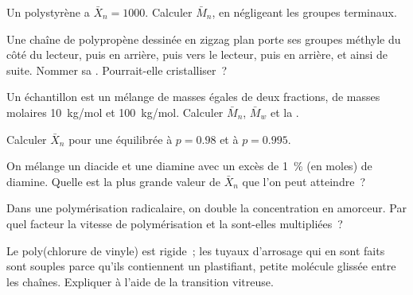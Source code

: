 \begin{exercise}[$\star$]\label{exo:b2:polymer-synthesis:3}
Un polystyrène a $\bar X_n = 1000$. Calculer $\bar M_n$, en négligeant les groupes terminaux.
\end{exercise}

\begin{exercise}[$\star$]\label{exo:b2:polymer-synthesis:4}
Une chaîne de polypropène dessinée en zigzag plan porte ses groupes méthyle du côté du lecteur, puis en
arrière, puis vers le lecteur, puis en arrière, et ainsi de suite. Nommer sa . Pourrait-elle cristalliser~?
\end{exercise}

\begin{exercise}[$\star\star$]\label{exo:b2:polymer-synthesis:5}
Un échantillon est un mélange de masses égales de deux fractions, de masses molaires \qty{10}{kg/mol} et
\qty{100}{kg/mol}. Calculer $\bar M_n$, $\bar M_w$ et la .
\end{exercise}

\begin{exercise}[$\star\star$]\label{exo:b2:polymer-synthesis:6}
Calculer $\bar X_n$ pour une  équilibrée à $p = 0.98$ et à $p = 0.995$.
\end{exercise}

\begin{exercise}[$\star\star$]\label{exo:b2:polymer-synthesis:7}
On mélange un diacide et une diamine avec un excès de 1~\% (en moles) de diamine. Quelle est la plus grande
valeur de $\bar X_n$ que l'on peut atteindre~?
\end{exercise}

\begin{exercise}[$\star\star$]\label{exo:b2:polymer-synthesis:8}
Dans une polymérisation radicalaire, on double la concentration en amorceur. Par quel facteur la vitesse
de polymérisation et la  sont-elles multipliées~?
\end{exercise}

\begin{exercise}[$\star\star$]\label{exo:b2:polymer-synthesis:9}
Le poly(chlorure de vinyle) est rigide~; les tuyaux d'arrosage qui en sont faits sont souples parce qu'ils
contiennent un plastifiant, petite molécule glissée entre les chaînes. Expliquer à l'aide de la transition vitreuse.
\end{exercise}

